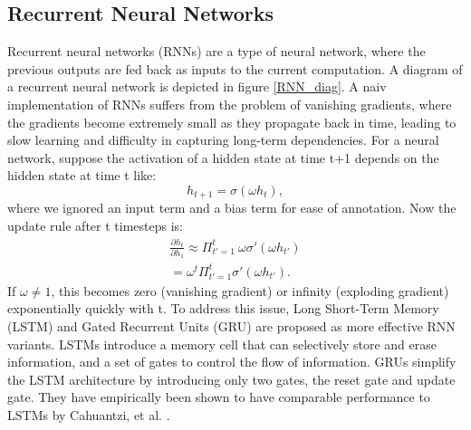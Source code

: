 \subsection{Recurrent Neural Networks}
\label{POMDP_RNN}
Recurrent neural networks (RNNs) are a type of neural network, where the previous outputs are fed back as inputs to the current computation. A diagram of a 
recurrent neural network is depicted in figure \ref{RNN_diag}. 
A naiv implementation of RNNs suffers from the problem of vanishing gradients, where the gradients become extremely small as they propagate back in time, 
leading to slow learning and difficulty in capturing long-term dependencies.
For a neural network, suppose the activation of a hidden state at time t+1 depends on the hidden state at time t like:
\begin{equation}
    h_{t+1} = \sigma(\omega h_t),
\end{equation}
where we ignored an input term and a bias term for ease of annotation. Now the update rule after t timesteps is:
\begin{align*}
        \frac{\partial h_t}{\partial h_1} \approx \Pi_{t'=1}^t \ \omega \sigma'(\omega h_{t'}) \\
        = \omega^{t} \Pi_{t'=1}^t \sigma'(\omega h_{t'}).
\end{align*}
If $\omega \neq 1$, this becomes zero (vanishing gradient) or infinity (exploding gradient) exponentially quickly with t.
To address this issue, Long Short-Term Memory (LSTM) and Gated Recurrent Units (GRU) are proposed as more effective RNN variants. 
LSTMs introduce a memory cell that can selectively store and erase information, and a set of gates to control the flow of information. 
GRUs simplify the LSTM architecture by introducing only two gates, the reset gate and update gate. 
They have empirically been shown to have comparable performance to LSTMs by Cahuantzi, et al. \cite{cahuantzi2023comparison}.

